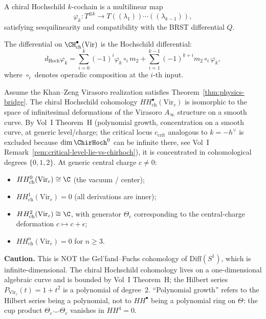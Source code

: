 \begin{definition}
A chiral Hochschild $k$-cochain is a multilinear map
\begin{equation}
\varphi_k: T^{\otimes k} \to T((\lambda_1))\cdots((\lambda_{k-1})),
\end{equation}
satisfying sesquilinearity and compatibility with the BRST differential $Q$.
\end{definition}

The differential on $\CH^\bullet_{\text{ch}}(\text{Vir})$ is the Hochschild differential:
\begin{equation}
\label{eq:hochschild-diff}
d_{\text{Hoch}} \varphi_k = \sum_{i=0}^k (-1)^i \varphi_k \circ_i m_2 + \sum_{i=1}^{k-1} (-1)^{k+i} m_2 \circ_i \varphi_k,
\end{equation}
where $\circ_i$ denotes operadic composition at the $i$-th input.

\begin{proposition}
\label{prop:vir-hochschild}
Assume the Khan--Zeng Virasoro realization satisfies
Theorem~\ref{thm:physics-bridge}.
The chiral Hochschild cohomology $HH^\bullet_{\text{ch}}(\text{Vir}_c)$ is isomorphic
to the space of infinitesimal deformations of the Virasoro $A_\infty$ structure on a
smooth curve. By Vol~I Theorem~H (polynomial growth, concentration on a smooth curve,
at generic level/charge; the critical locus $c_{\mathrm{crit}}$ analogous to $k = -h^\vee$
is excluded because $\dim \ChirHoch^0$ can be infinite there, see Vol~I
Remark~\ref*{rem:critical-level-lie-vs-chirhoch}),
it is concentrated in cohomological degrees $\{0,1,2\}$. At generic central charge $c \neq 0$:
\begin{itemize}
\item $HH^0_{\text{ch}}(\text{Vir}_c) \cong \C$ (the vacuum / center);
\item $HH^1_{\text{ch}}(\text{Vir}_c) = 0$ (all derivations are inner);
\item $HH^2_{\text{ch}}(\text{Vir}_c) \cong \C$, with generator $\Theta_c$ corresponding
 to the central-charge deformation $c \mapsto c + \epsilon$;
\item $HH^n_{\text{ch}}(\text{Vir}_c) = 0$ for $n \geq 3$.
\end{itemize}
\textbf{Caution.} This is NOT the Gel'fand--Fuchs cohomology of $\mathrm{Diff}(S^1)$,
which is infinite-dimensional. The chiral Hochschild cohomology lives on a one-dimensional
algebraic curve and is bounded by Vol~I Theorem~H; the Hilbert series
$P_{\text{Vir}_c}(t) = 1 + t^2$ is a polynomial of degree~$2$. ``Polynomial growth''
refers to the Hilbert series being a polynomial, not to $HH^\bullet$ being a polynomial
ring on $\Theta$: the cup product $\Theta_c \smile \Theta_c$ vanishes in $HH^4 = 0$.
\end{proposition}

